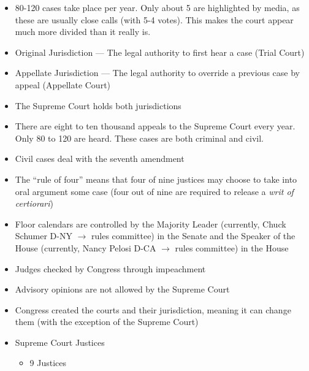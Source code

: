\documentclass[12pt]{article}
\begin{document}
\begin{itemize}
  \item 80-120 cases take place per year. Only about 5 are highlighted by media, as these are usually close calls (with 5-4 votes). This makes the court appear much more divided than it really is.

  \item Original Jurisdiction — The legal authority to first hear a case (Trial Court)

  \item Appellate Jurisdiction — The legal authority to override a previous case by appeal (Appellate Court)

  \item The Supreme Court holds both jurisdictions

  \item There are eight to ten thousand appeals to the Supreme Court every year. Only 80 to 120 are heard. These cases are both criminal and civil.

  \item Civil cases deal with the seventh amendment

  \item The “rule of four” means that four of nine justices may choose to take into oral argument some case (four out of nine are required to release a \textit{writ of certiorari})

  \item Floor calendars are controlled by the Majority Leader (currently, Chuck Schumer D-NY $\longrightarrow$ rules committee) in the Senate and the Speaker of the House (currently, Nancy Pelosi D-CA $\longrightarrow$ rules committee) in the House

  \item Judges checked by Congress through impeachment

  \item Advisory opinions are not allowed by the Supreme Court

  \item Congress created the courts and their jurisdiction, meaning it can change them (with the exception of the Supreme Court)

  \item Supreme Court Justices

    \begin{itemize}

      \item 9 Justices

        \begin{itemize}


\end{itemize}
\end{itemize}
\end{itemize}
\end{document}
